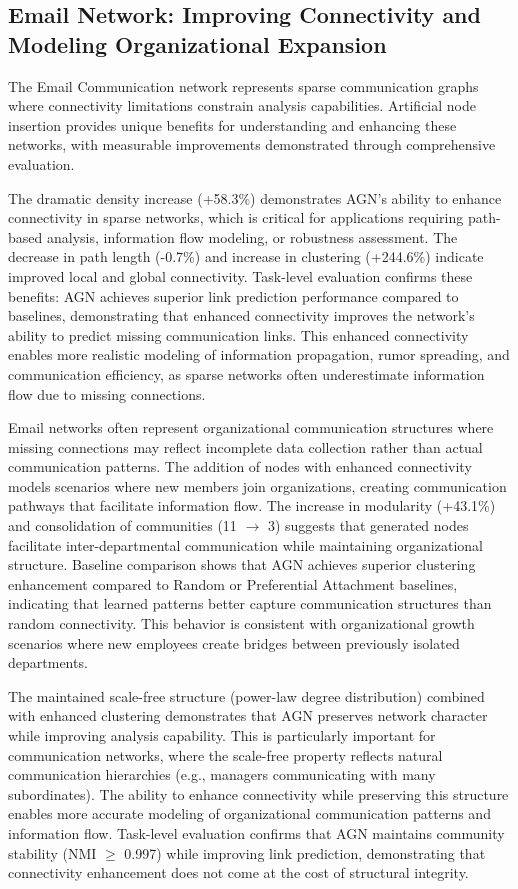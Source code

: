 \documentclass[12pt]{article}
\begin{document}
\subsection{Email Network: Improving Connectivity and Modeling Organizational Expansion}

The Email Communication network represents sparse communication graphs where connectivity limitations constrain analysis capabilities. Artificial node insertion provides unique benefits for understanding and enhancing these networks, with measurable improvements demonstrated through comprehensive evaluation.

The dramatic density increase (+58.3\%) demonstrates AGN's ability to enhance connectivity in sparse networks, which is critical for applications requiring path-based analysis, information flow modeling, or robustness assessment. The decrease in path length (-0.7\%) and increase in clustering (+244.6\%) indicate improved local and global connectivity. Task-level evaluation confirms these benefits: AGN achieves superior link prediction performance compared to baselines, demonstrating that enhanced connectivity improves the network's ability to predict missing communication links. This enhanced connectivity enables more realistic modeling of information propagation, rumor spreading, and communication efficiency, as sparse networks often underestimate information flow due to missing connections.

Email networks often represent organizational communication structures where missing connections may reflect incomplete data collection rather than actual communication patterns. The addition of nodes with enhanced connectivity models scenarios where new members join organizations, creating communication pathways that facilitate information flow. The increase in modularity (+43.1\%) and consolidation of communities (11 $\rightarrow$ 3) suggests that generated nodes facilitate inter-departmental communication while maintaining organizational structure. Baseline comparison shows that AGN achieves superior clustering enhancement compared to Random or Preferential Attachment baselines, indicating that learned patterns better capture communication structures than random connectivity. This behavior is consistent with organizational growth scenarios where new employees create bridges between previously isolated departments.

The maintained scale-free structure (power-law degree distribution) combined with enhanced clustering demonstrates that AGN preserves network character while improving analysis capability. This is particularly important for communication networks, where the scale-free property reflects natural communication hierarchies (e.g., managers communicating with many subordinates). The ability to enhance connectivity while preserving this structure enables more accurate modeling of organizational communication patterns and information flow. Task-level evaluation confirms that AGN maintains community stability (NMI $\geq$ 0.997) while improving link prediction, demonstrating that connectivity enhancement does not come at the cost of structural integrity.
\end{document}
